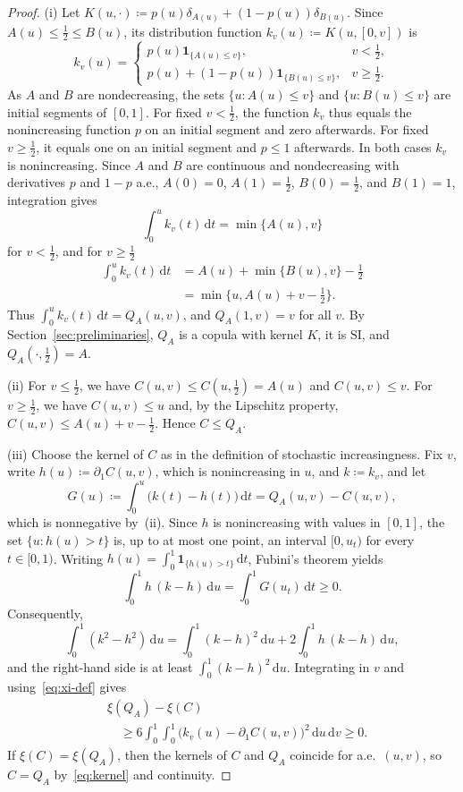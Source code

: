 \documentclass[twocolumn,a4paper]{article}
\numberwithin{equation}{section}
\theoremstyle{remark}
\newcommand{\1}{\mathbf{1}}
\newcommand{\de}{\,\mathrm{d}}
\newcommand{\SI}{\mathrm{SI}}
\begin{document}
\begin{proof}
(i) Let \(K(u,\cdot)\coloneqq p(u)\delta_{A(u)}+(1-p(u))\delta_{B(u)}\).
Since \(A(u)\le\tfrac12\le B(u)\), its distribution function \(k_v(u)\coloneqq K(u,[0,v])\) is
\[
k_v(u)=
\begin{cases}
p(u)\1_{\{A(u)\le v\}},&v<\tfrac12,\\
p(u)+(1-p(u))\1_{\{B(u)\le v\}},&v\ge\tfrac12.
\end{cases}
\]
As \(A\) and \(B\) are nondecreasing, the sets \(\{u:A(u)\le v\}\) and \(\{u:B(u)\le v\}\) are initial segments of \([0,1]\).
For fixed \(v<\tfrac12\), the function \(k_v\) thus equals the nonincreasing function \(p\) on an initial segment and zero afterwards.
For fixed \(v\ge\tfrac12\), it equals one on an initial segment and \(p\le1\) afterwards.
In both cases \(k_v\) is nonincreasing.
Since \(A\) and \(B\) are continuous and nondecreasing with derivatives \(p\) and \(1-p\) a.e., \(A(0)=0\), \(A(1)=\tfrac12\), \(B(0)=\tfrac12\), and \(B(1)=1\), integration gives
\[
\int_0^uk_v(t)\de t=\min\{A(u),v\}
\]
for \(v<\tfrac12\), and for \(v\ge\tfrac12\)
\begin{align*}
\int_0^uk_v(t)\de t&=A(u)+\min\{B(u),v\}-\tfrac12\\
&=\min\{u,A(u)+v-\tfrac12\}.
\end{align*}
Thus \(\int_0^uk_v(t)\de t=Q_A(u,v)\), and \(Q_A(1,v)=v\) for all \(v\).
By Section~\ref{sec:preliminaries}, \(Q_A\) is a copula with kernel \(K\), it is \(\SI\), and \(Q_A(\cdot,\tfrac12)=A\).

(ii) For \(v\le\tfrac12\), we have \(C(u,v)\le C(u,\tfrac12)=A(u)\) and \(C(u,v)\le v\).
For \(v\ge\tfrac12\), we have \(C(u,v)\le u\) and, by the Lipschitz property, \(C(u,v)\le A(u)+v-\tfrac12\).
Hence \(C\le Q_A\).

(iii) Choose the kernel of \(C\) as in the definition of stochastic increasingness.
Fix \(v\), write \(h(u)\coloneqq\partial_1C(u,v)\), which is nonincreasing in \(u\), and \(k\coloneqq k_v\), and let
\[
G(u)\coloneqq\int_0^u\bigl(k(t)-h(t)\bigr)\de t=Q_A(u,v)-C(u,v),
\]
which is nonnegative by~(ii).
Since \(h\) is nonincreasing with values in \([0,1]\), the set \(\{u:h(u)>t\}\) is, up to at most one point, an interval \([0,u_t)\) for every \(t\in[0,1)\).
Writing \(h(u)=\int_0^1\1_{\{h(u)>t\}}\de t\), Fubini's theorem yields
\[
\int_0^1h\,(k-h)\de u=\int_0^1G(u_t)\de t\ge0.
\]
Consequently,
\[
\int_0^1(k^2-h^2)\de u=\int_0^1(k-h)^2\de u+2\int_0^1h\,(k-h)\de u,
\]
and the right-hand side is at least \(\int_0^1(k-h)^2\de u\).
Integrating in \(v\) and using~\eqref{eq:xi-def} gives
\begin{align*}
&\xi(Q_A)-\xi(C)\\
&\quad\ge6\int_0^1\!\!\int_0^1\bigl(k_v(u)-\partial_1C(u,v)\bigr)^2\de u\de v\ge0.
\end{align*}
If \(\xi(C)=\xi(Q_A)\), then the kernels of \(C\) and \(Q_A\) coincide for a.e.\ \((u,v)\), so \(C=Q_A\) by~\eqref{eq:kernel} and continuity.
\end{proof}
\end{document}
